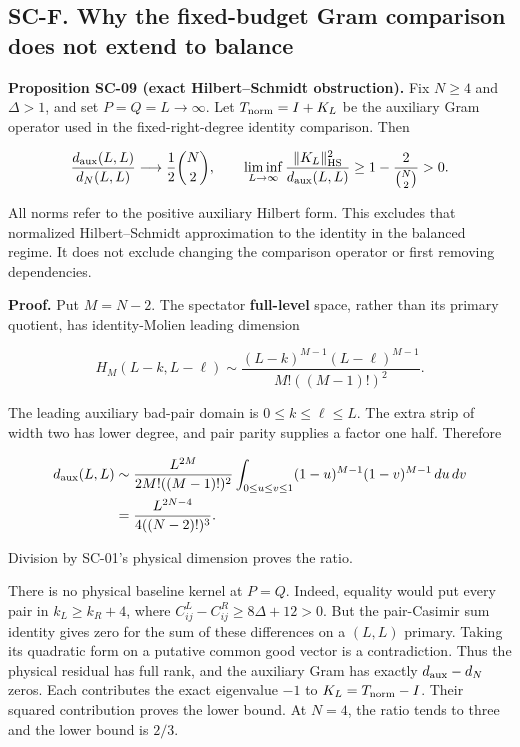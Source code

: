 \documentclass[a4paper,11pt]{article}
\numberwithin{equation}{section}
\begin{document}
\hypertarget{sc-f.-why-the-fixed-budget-gram-comparison-does-not-extend-to-balance}{%
\subsection{SC-F. Why the fixed-budget Gram comparison does not extend to balance}\label{sc-f.-why-the-fixed-budget-gram-comparison-does-not-extend-to-balance}}

\textbf{Proposition SC-09 (exact Hilbert--Schmidt obstruction).} Fix \(N\geq4\) and \(\Delta>1\), and set \(P=Q=L\to\infty\). Let \(T_{\rm norm}=I+K_L\) be the auxiliary Gram operator used in the fixed-right-degree identity comparison. Then

\[
\frac{d_{\rm aux}(L,L)}{d_N(L,L)}
\longrightarrow\frac12\binom N2,
\qquad
\liminf_{L\to\infty}
\frac{\|K_L\|_{\rm HS}^2}{d_{\rm aux}(L,L)}
\geq1-\frac{2}{\binom N2}>0.
\]

All norms refer to the positive auxiliary Hilbert form. This excludes that normalized Hilbert--Schmidt approximation to the identity in the balanced regime. It does not exclude changing the comparison operator or first removing dependencies.

\textbf{Proof.} Put \(M=N-2\). The spectator \textbf{full-level} space, rather than its primary quotient, has identity-Molien leading dimension

\[
H_M(L-k,L-\ell)\sim
\frac{(L-k)^{M-1}(L-\ell)^{M-1}}{M!((M-1)!)^2}.
\]

The leading auxiliary bad-pair domain is \(0\leq k\leq\ell\leq L\). The extra strip of width two has lower degree, and pair parity supplies a factor one half. Therefore

\[
\begin{aligned}
d_{\rm aux}(L,L)
&\sim\frac{L^{2M}}{2M!((M-1)!)^2}
\int_{0\leq u\leq v\leq1}(1-u)^{M-1}(1-v)^{M-1}\,du\,dv\\
&=\frac{L^{2N-4}}{4((N-2)!)^3}.
\end{aligned}
\]

Division by SC-01's physical dimension proves the ratio.

There is no physical baseline kernel at \(P=Q\). Indeed, equality would put every pair in \(k_L\geq k_R+4\), where \(C_{ij}^L-C_{ij}^R\geq8\Delta+12>0\). But the pair-Casimir sum identity gives zero for the sum of these differences on a \((L,L)\) primary. Taking its quadratic form on a putative common good vector is a contradiction. Thus the physical residual has full rank, and the auxiliary Gram has exactly \(d_{\rm aux}-d_N\) zeros. Each contributes the exact eigenvalue \(-1\) to \(K_L=T_{\rm norm}-I\). Their squared contribution proves the lower bound. At \(N=4\), the ratio tends to three and the lower bound is \(2/3\).
\end{document}
